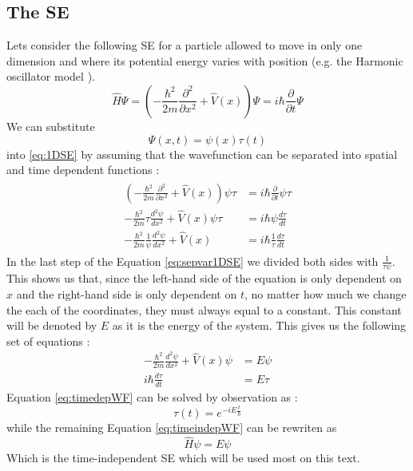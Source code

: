 \documentclass[../master_thesis.tex]{subfiles}
\begin{document}
\subsection{The \ac{SE}}
Lets consider the following \ac{SE} for a particle allowed to move in only one dimension
and where its potential energy varies with position (e.g. the Harmonic oscillator
model \cite{Cohen:1973, Atkins:2014}).
\begin{equation}
  \hat{H}\Psi = \left(-\frac{\hbar^2}{2m}\frac{\partial^2 }{\partial x^2} + \hat{V}(x)\right)\Psi = i\hbar\frac{\partial}{\partial t} \Psi\label{eq:1DSE}
\end{equation}
We can substitute $$\Psi(x, t)=\psi(x)\tau(t)$$ into \ref{eq:1DSE}
by assuming that the wavefunction can be separated into spatial and time dependent
functions \cite{Atkins:2011}:
\begin{align}
  \begin{split}\label{eq:sepvar1DSE}
    \left(-\frac{\hbar^2}{2m}\frac{\partial^2 }{\partial x^2} + \hat{V}(x)\right)\psi\tau &= i\hbar\frac{\partial}{\partial t} \psi\tau \\
    -\frac{\hbar^2}{2m}\tau\frac{d^2 \psi}{d x^2} + \hat{V}(x)\psi\tau &= i\hbar\psi\frac{d\tau}{d t}\\
    -\frac{\hbar^2}{2m}\frac{1}{\psi}\frac{d^2\psi }{d x^2} + \hat{V}(x) &= i\hbar\frac{1}{\tau}\frac{d\tau}{d t}
  \end{split}
\end{align}
In the last step of the Equation \ref{eq:sepvar1DSE} we divided both sides with $\frac{1}{\tau\psi}$.
This shows us that, since the left-hand side of the equation is only dependent on $x$ and the right-hand
side is only dependent on $t$, no matter how much we change the each of the coordinates, they must always equal to
a constant. This constant will be denoted by $E$ as it is the energy of the system. This gives us the following set of equations \cite{Atkins:2011}:
\begin{subequations}
  \label{eq:sysSE}
  \begin{align}
    -\frac{\hbar^2}{2m}\frac{d^2\psi}{d x^2} + \hat{V}(x)\psi &= E\psi  \label{eq:timeindepWF}\\
    i\hbar\frac{d\tau}{d t} &= E\tau  \label{eq:timedepWF}
  \end{align}
\end{subequations}
Equation \ref{eq:timedepWF} can be solved by observation as \cite{Atkins:2011, Cohen:1973} :
\begin{equation}
  \tau(t) = e^{-iE\frac{t}{\hbar}}
\end{equation}
while the remaining Equation \ref{eq:timeindepWF} can be rewriten as
\begin{equation}
  \hat{H}\psi = E\psi\label{eq:timeindepSE}
\end{equation}
Which is the time-independent \ac{SE} which will be used most on this text.
\end{document}
